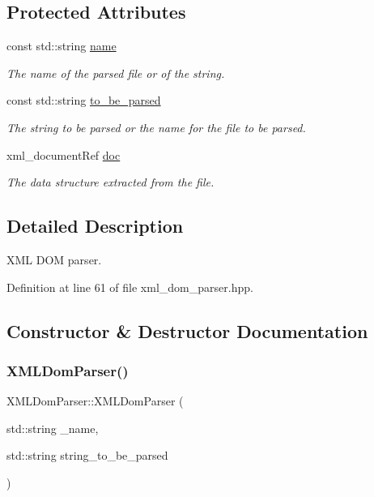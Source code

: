 \subsection*{Protected Attributes}
\begin{DoxyCompactItemize}
\item 
const std\+::string \hyperlink{classXMLDomParser_a81d9e7ce6d3eecff046287f925b93218}{name}
\begin{DoxyCompactList}\small\item\em The name of the parsed file or of the string. \end{DoxyCompactList}\item 
const std\+::string \hyperlink{classXMLDomParser_ae7556f9c24b379dd9fbe397fa57bd187}{to\+\_\+be\+\_\+parsed}
\begin{DoxyCompactList}\small\item\em The string to be parsed or the name for the file to be parsed. \end{DoxyCompactList}\item 
xml\+\_\+document\+Ref \hyperlink{classXMLDomParser_ac31ace6dd3dfbcbac73044d73bba2821}{doc}
\begin{DoxyCompactList}\small\item\em The data structure extracted from the file. \end{DoxyCompactList}\end{DoxyCompactItemize}


\subsection{Detailed Description}
X\+ML D\+OM parser. 

Definition at line 61 of file xml\+\_\+dom\+\_\+parser.\+hpp.



\subsection{Constructor \& Destructor Documentation}
\mbox{\label{classXMLDomParser_a19a7034df5eb18d9cedee6b89acafd5e}} 
\subsubsection{\texorpdfstring{X\+M\+L\+Dom\+Parser()}{XMLDomParser()}\hspace{0.1cm}{\footnotesize\ttfamily [1/2]}}
{\footnotesize\ttfamily X\+M\+L\+Dom\+Parser\+::\+X\+M\+L\+Dom\+Parser (\begin{DoxyParamCaption}\item[{std\+::string}]{\+\_\+name,  }\item[{std\+::string}]{string\+\_\+to\+\_\+be\+\_\+parsed }\end{DoxyParamCaption})}




